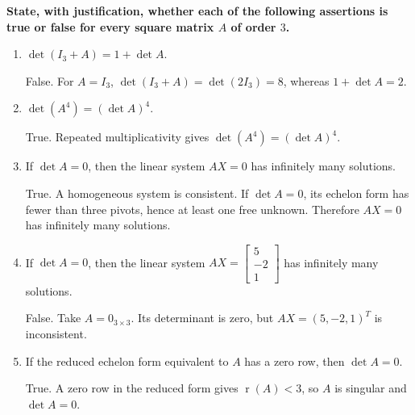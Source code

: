 \providecommand{\rank}{\operatorname{r}}
\providecommand{\RR}{\mathbb R}
\providecommand{\CC}{\mathbb C}
\providecommand{\KK}{\mathbb K}

\setcounter{enumi}{53}
\item {\bfseries\boldmath
State, with justification, whether each of the following assertions is true or false for every square matrix $A$ of order $3$.
}

\begin{enumerate}[label=\alph*)]

\item $\det(I_3+A)=1+\det A$.

\begin{answer}
False. For $A=I_3$, $\det(I_3+A)=\det(2I_3)=8$, whereas $1+\det A=2$.
\end{answer}

\item $\det(A^4)=(\det A)^4$.

\begin{answer}
True. Repeated multiplicativity gives $\det(A^4)=(\det A)^4$.
\end{answer}

\item If $\det A=0$, then the linear system $AX=0$ has infinitely many solutions.

\begin{answer}
True. A homogeneous system is consistent. If $\det A=0$, its echelon
form has fewer than three pivots, hence at least one free unknown. Therefore
$AX=0$ has infinitely many solutions.
\end{answer}

\item If $\det A=0$, then the linear system $AX=\begin{bmatrix}5\\-2\\1\end{bmatrix}$ has infinitely many solutions.

\begin{answer}
False. Take $A=0_{3\times3}$. Its determinant is zero, but
$AX=(5,-2,1)^T$ is inconsistent.
\end{answer}

\item If the reduced echelon form equivalent to $A$ has a zero row, then $\det A=0$.

\begin{answer}
True. A zero row in the reduced form gives $\rank(A)<3$, so $A$ is
singular and $\det A=0$.
\end{answer}
\end{enumerate}
